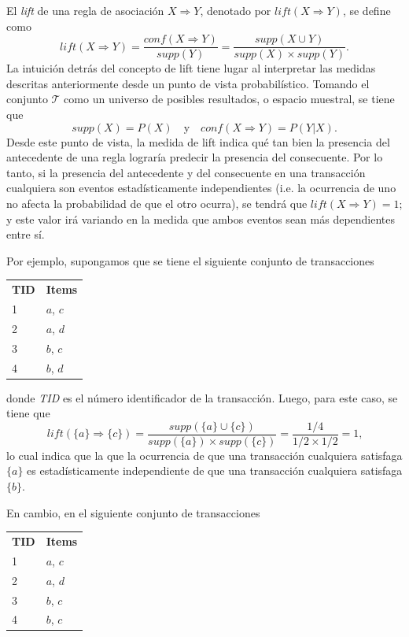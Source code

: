 El \textit{lift} de una regla de asociación $X \Rightarrow Y$, denotado por $\mathit{lift}(X \Rightarrow Y)$, se define como $$\mathit{lift}(X \Rightarrow Y) = \frac{\mathit{conf}(X \Rightarrow Y)}{\mathit{supp}(Y)} = \frac{\mathit{supp}(X \cup Y)}{\mathit{supp}(X) \times \mathit{supp}(Y)}\text{.}$$ La intuición detrás del concepto de lift tiene lugar al interpretar las medidas descritas anteriormente desde un punto de vista probabilístico. Tomando el conjunto $\mathcal{T}$ como un universo de posibles resultados, o espacio muestral, se tiene que $$\mathit{supp}(X) = P(X) \quad \text{y} \quad \mathit{conf}(X \Rightarrow Y) = P(Y| X)\text{.}$$ Desde este punto de vista, la medida de lift indica qué tan bien la presencia del antecedente de una regla lograría predecir la presencia del consecuente. Por lo tanto, si la presencia del antecedente y del consecuente en una transacción cualquiera son eventos estadísticamente independientes (i.e. la ocurrencia de uno no afecta la probabilidad de que el otro ocurra), se tendrá que $\mathit{lift}(X \Rightarrow Y) = 1$; y este valor irá variando en la medida que ambos eventos sean más dependientes entre sí.

Por ejemplo, supongamos que se tiene el siguiente conjunto de transacciones

\begin{tabular}{l l}
\textbf{TID} & \textbf{Items} \\
1 & $a$, $c$ \\
2 & $a$, $d$ \\
3 & $b$, $c$ \\
4 & $b$, $d$ \\
\end{tabular}

donde \textit{TID} es el número identificador de la transacción. Luego, para este caso, se tiene que $$\mathit{lift}(\{a\} \Rightarrow \{c\}) = \frac{\mathit{supp}(\{a\} \cup \{c\})}{\mathit{supp}(\{a\}) \times \mathit{supp}(\{c\})} = \frac{1/4}{1/2 \times 1/2} = 1\text{,}$$ lo cual indica que la que la ocurrencia de que una transacción cualquiera satisfaga $\{a\}$ es estadísticamente independiente de que una transacción cualquiera satisfaga $\{b\}$.

En cambio, en el siguiente conjunto de transacciones

\begin{tabular}{l l}
\textbf{TID} & \textbf{Items} \\
1 & $a$, $c$ \\
2 & $a$, $d$ \\
3 & $b$, $c$ \\
4 & $b$, $c$ \\
\end{tabular}

